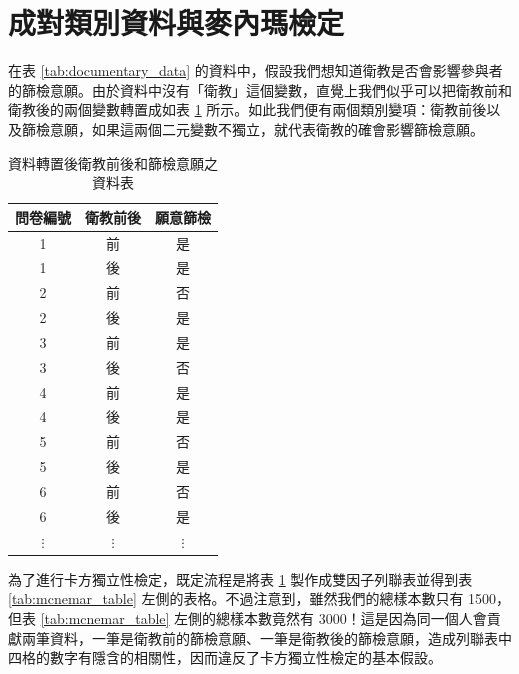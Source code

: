 \section{成對類別資料與麥內瑪檢定}

    在表 \ref{tab:documentary_data} 的資料中，假設我們想知道衛教是否會影響參與者的篩檢意願。由於資料中沒有「衛教」這個變數，直覺上我們似乎可以把衛教前和衛教後的兩個變數轉置成如表 \ref{tab:dependent_data} 所示。如此我們便有兩個類別變項：衛教前後以及篩檢意願，如果這兩個二元變數不獨立，就代表衛教的確會影響篩檢意願。

    \begin{table}[htbp]
        \begin{center}
            \begin{tabular}{ccc}
                \toprule
                問卷編號 & 衛教前後 & 願意篩檢\\
                \hline
                1 & 前 & 是\\
                1 & 後 & 是\\
                2 & 前 & 否\\
                2 & 後 & 是\\
                3 & 前 & 是\\
                3 & 後 & 否\\
                4 & 前 & 是\\
                4 & 後 & 是\\
                5 & 前 & 否\\
                5 & 後 & 是\\
                6 & 前 & 否\\
                6 & 後 & 是\\
                $\vdots$ & $\vdots$ & $\vdots$\\
                \bottomrule
            \end{tabular}
            \caption{資料轉置後衛教前後和篩檢意願之資料表\label{tab:dependent_data}}
        \end{center}
    \end{table}

    為了進行卡方獨立性檢定，既定流程是將表 \ref{tab:dependent_data} 製作成雙因子列聯表並得到表 \ref{tab:mcnemar_table} 左側的表格。不過注意到，雖然我們的總樣本數只有 1500，但表 \ref{tab:mcnemar_table} 左側的總樣本數竟然有 3000！這是因為同一個人會貢獻兩筆資料，一筆是衛教前的篩檢意願、一筆是衛教後的篩檢意願，造成列聯表中四格的數字有隱含的相關性，因而違反了卡方獨立性檢定的基本假設。

